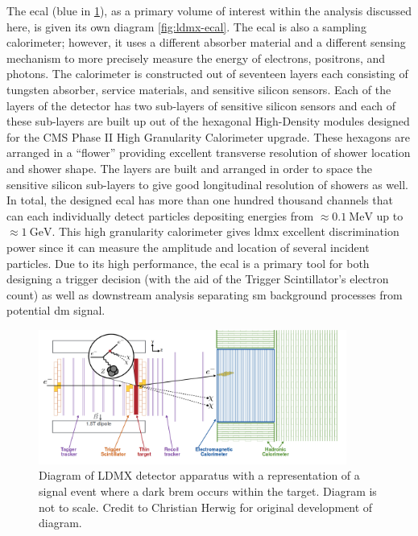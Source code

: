 The \ac{ecal} (blue in \cref{fig:ldmx-det}), as a primary volume of interest within the analysis
discussed here, is given its own diagram \cref{fig:ldmx-ecal}. The \ac{ecal} is also a sampling
calorimeter; however, it uses a different absorber material and a different sensing mechanism to
more precisely measure the energy of electrons, positrons, and photons. The calorimeter is
constructed out of seventeen layers each consisting of tungsten absorber, service materials, and
sensitive silicon sensors. Each of the layers of the detector has two sub-layers of sensitive
silicon sensors and each of these sub-layers are built up out of the hexagonal High-Density modules
designed for the CMS Phase II High Granularity Calorimeter upgrade\cite{cms-phase-2-tdr}. These
hexagons are arranged in a ``flower'' providing excellent transverse resolution of shower location
and shower shape. The layers are built and arranged in order to space the sensitive silicon
sub-layers to give good longitudinal resolution of showers as well. In total, the designed
\ac{ecal} has more than one hundred thousand channels that can each individually detect particles
depositing energies from $\approx \qty{0.1}{\mega\electronvolt}$ up to
$\approx\qty{1}{\giga\electronvolt}$.
This high granularity calorimeter gives \ac{ldmx} excellent discrimination power since it can
measure the amplitude and location of several incident particles.
Due to its high performance, the \ac{ecal} is a primary tool for both
designing a trigger decision (with the aid of the Trigger Scintillator's electron count) as well as
downstream analysis separating \ac{sm} background processes from potential \ac{dm} signal.

\begin{figure}
  \centering
  \includegraphics[width=0.9\textwidth]{figures/ldmx/experiment/detector.png}
  \caption{
    Diagram of LDMX detector apparatus with a representation of a signal event where
    a dark brem occurs within the target. Diagram is not to scale. Credit to Christian Herwig
    for original development of diagram.
  }
  \label{fig:ldmx-det}
\end{figure}

